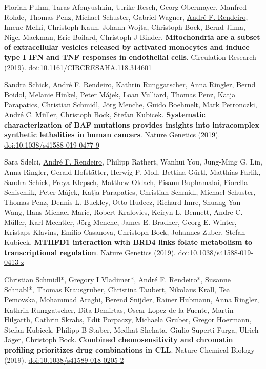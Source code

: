 \documentclass[11pt,a4paper,roman]{moderncv} %
\begin{document}
\begin{etaremune}[leftmargin=1.0cm, itemindent=0pt, topsep=10pt, itemsep=2pt, partopsep=0pt, parsep=0pt]
        \item Florian Puhm, Taras Afonyushkin, Ulrike Resch, Georg Obermayer, Manfred Rohde, Thomas Penz, Michael Schuster, Gabriel Wagner, \underline{André F. Rendeiro}, Imene Melki, Christoph Kaun, Johann Wojta, Christoph Bock, Bernd Jilma, Nigel Mackman, Eric Boilard, Christoph J Binder. \textbf{Mitochondria are a subset of extracellular vesicles released by activated monocytes and induce type I IFN and TNF responses in endothelial cells}. Circulation Research (2019).
        \href{https://dx.doi.org/10.1161/CIRCRESAHA.118.314601}{doi:10.1161/CIRCRESAHA.118.314601}

        \item Sandra Schick, \underline{André F. Rendeiro}, Kathrin Runggatscher, Anna Ringler, Bernd Boidol, Melanie Hinkel, Peter Májek, Loan Vulliard, Thomas Penz, Katja Parapatics, Christian Schmidl, Jörg Menche, Guido Boehmelt, Mark Petronczki, André C. Müller, Christoph Bock, Stefan Kubicek. \textbf{Systematic characterization of BAF mutations provides insights into intracomplex synthetic lethalities in human cancers}. Nature Genetics (2019).
        \href{https://dx.doi.org/10.1038/s41588-019-0477-9}{doi:10.1038/s41588-019-0477-9}

        \item Sara Sdelci, \underline{André F. Rendeiro}, Philipp Rathert, Wanhui You, Jung-Ming G. Lin, Anna Ringler, Gerald Hofstätter, Herwig P. Moll, Bettina Gürtl, Matthias Farlik, Sandra Schick, Freya Klepsch, Matthew Oldach, Pisanu Buphamalai, Fiorella Schischlik, Peter Májek, Katja Parapatics, Christian Schmidl, Michael Schuster, Thomas Penz, Dennis L. Buckley, Otto Hudecz, Richard Imre, Shuang-Yan Wang, Hans Michael Maric, Robert Kralovics, Keiryn L. Bennett, Andre C. Müller, Karl Mechtler, Jörg Menche, James E. Bradner, Georg E. Winter, Kristaps Klavins, Emilio Casanova, Christoph Bock, Johannes Zuber, Stefan Kubicek. \textbf{MTHFD1 interaction with BRD4 links folate metabolism to transcriptional regulation}. Nature Genetics (2019).
        \href{https://dx.doi.org/10.1038/s41588-019-0413-z}{doi:10.1038/s41588-019-0413-z}

        \item Christian Schmidl*, Gregory I Vladimer*, \underline{André F. Rendeiro}*, Susanne Schnabl*, Thomas Krausgruber, Christina Taubert, Nikolaus Krall, Tea Pemovska, Mohammad Araghi, Berend Snijder, Rainer Hubmann, Anna Ringler, Kathrin Runggatscher, Dita Demirtas, Oscar Lopez de la Fuente, Martin Hilgarth, Cathrin Skrabs, Edit Porpaczy, Michaela Gruber, Gregor Hoermann, Stefan Kubicek, Philipp B Staber, Medhat Shehata, Giulio Superti-Furga, Ulrich Jäger, Christoph Bock. \textbf{Combined chemosensitivity and chromatin profiling prioritizes drug combinations in CLL}. Nature Chemical Biology (2019).
        \href{https://dx.doi.org/10.1038/s41589-018-0205-2}{doi:10.1038/s41589-018-0205-2}


\end{etaremune}
\end{document}
